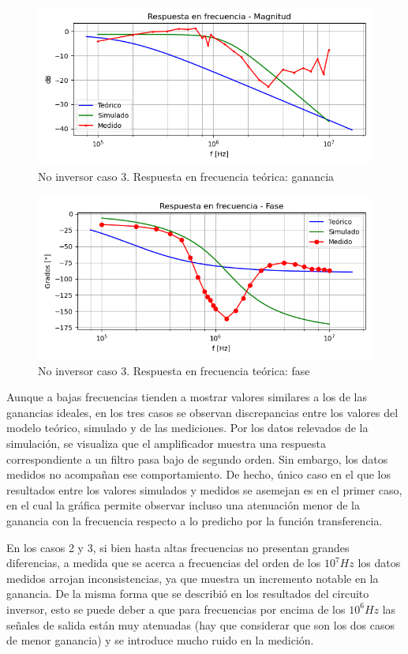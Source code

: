 \begin{figure}[H]
	\centering
		\includegraphics[width=.8\linewidth]{./Imagenes/NoInvCaso3Gain.png}  
		\caption{No inversor caso 3. Respuesta en frecuencia teórica: ganancia}
	\label{fig:circinvcaso1}
\end{figure}

\begin{figure}[H]
	\centering
		\includegraphics[width=.8\linewidth]{./Imagenes/NoInvCaso3Phase.png}  
		\caption{No inversor caso 3. Respuesta en frecuencia teórica: fase}
	\label{fig:circinvcaso1}
\end{figure}

Aunque a bajas frecuencias tienden a mostrar valores similares a los de las ganancias ideales, en los tres casos se observan discrepancias entre los valores del modelo teórico, simulado y de las mediciones. Por los datos relevados de la simulación, se visualiza que el amplificador muestra una respuesta correspondiente a un filtro pasa bajo de segundo orden. Sin embargo, los datos medidos no acompañan ese comportamiento. 
De hecho, único caso en el que los resultados entre los valores simulados y medidos se asemejan es en el primer caso, en el cual la gráfica permite observar incluso una atenuación menor de la ganancia con la frecuencia respecto a lo predicho por la función transferencia. 

En los casos 2 y 3, si bien hasta altas frecuencias no presentan grandes diferencias, a medida que se acerca a frecuencias del orden de los $10^{7} Hz$ los datos medidos arrojan inconsistencias, ya que muestra un incremento notable en la ganancia. De la misma forma que se describió en los resultados del circuito inversor, esto se puede deber a que para frecuencias por encima de los $10^{6} Hz$ las señales de salida están muy atenuadas (hay que considerar que son los dos casos de menor ganancia) y se introduce mucho ruido en la medición. 

